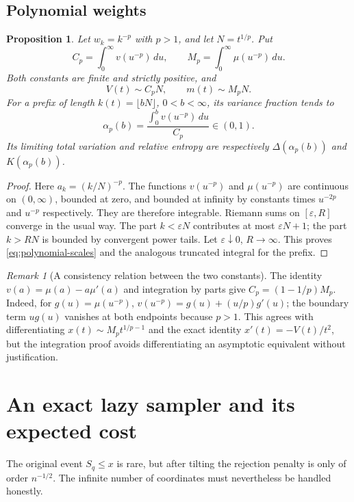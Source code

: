 \documentclass[11pt,a4paper]{article}
\numberwithin{equation}{section}
\newtheorem{proposition}[proposition]{Proposition}
\theoremstyle{definition}
\theoremstyle{remark}
\newtheorem{remark}[remark]{Remark}
\begin{document}
\subsection{Polynomial weights}
\begin{proposition}\label{prop:polynomial}
Let $w_k=k^{-p}$ with $p>1$, and let $N=t^{1/p}$. Put
\begin{equation}\label{eq:CpDp}
 C_p=\int_0^\infty v(u^{-p})\,du,\qquad
 M_p=\int_0^\infty\mu(u^{-p})\,du.
\end{equation}
Both constants are finite and strictly positive, and
\begin{equation}\label{eq:polynomial-scales}
 V(t)\sim C_pN,\qquad m(t)\sim M_pN.
\end{equation}
For a prefix of length
$k(t)=\lfloor bN\rfloor$, $0<b<\infty$, its variance fraction tends
to
\begin{equation}\label{eq:poly-alpha}
 \alpha_p(b)=\frac{\int_0^b v(u^{-p})\,du}{C_p}\in(0,1).
\end{equation}
Its limiting total variation and relative entropy are respectively
$\Delta(\alpha_p(b))$ and $K(\alpha_p(b))$.
\end{proposition}
\begin{proof}
Here $a_k=(k/N)^{-p}$. The functions
$v(u^{-p})$ and $\mu(u^{-p})$ are continuous on $(0,\infty)$,
bounded at zero, and bounded at infinity by constants times
$u^{-2p}$ and $u^{-p}$ respectively. They are therefore integrable.
Riemann sums on $[\varepsilon,R]$ converge in the usual way. The
part $k<\varepsilon N$ contributes at most $\varepsilon N+1$;
the part $k>RN$ is bounded by convergent power tails. Let
$\varepsilon\downarrow0$, $R\to\infty$. This proves
\cref{eq:polynomial-scales} and the analogous truncated integral
for the prefix.

\end{proof}

\begin{remark}[A consistency relation between the two constants]
The identity $v(a)=\mu(a)-a\mu'(a)$ and integration by parts give
$C_p=(1-1/p)M_p$. Indeed, for $g(u)=\mu(u^{-p})$,
$v(u^{-p})=g(u)+(u/p)g'(u)$; the boundary term $ug(u)$ vanishes at
both endpoints because $p>1$. This agrees with differentiating
$x(t)\sim M_pt^{1/p-1}$ and the exact identity
$x'(t)=-V(t)/t^2$, but the integration proof avoids differentiating
an asymptotic equivalent without justification.
\end{remark}

\section{An exact lazy sampler and its expected cost}
\label{sec:sampling}
The original event $S_q\le x$ is rare, but after tilting the rejection
penalty is only of order $n^{-1/2}$. The infinite number of
coordinates must nevertheless be handled honestly.
\end{document}
